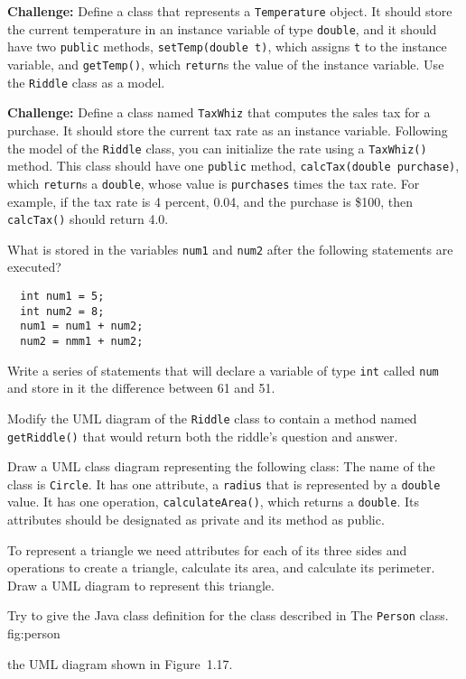 \begin{EXRtwo}
\item  {\bf Challenge:} Define a class that represents a {\tt Temperature}
object.   It should store the current temperature in an instance
variable of type {\tt double}, and it should have two {\tt public}
methods, {\tt setTemp(double t)}, which assigns {\tt t} to the
instance variable, and {\tt getTemp()}, which {\tt return}s the value
of the instance variable.   Use the {\tt Riddle} class as a model.

\item  {\bf Challenge:} Define a class named {\tt TaxWhiz} that computes the
sales tax for a purchase.  It should store the current tax rate as an
instance variable.   Following the model of the {\tt Riddle} class,
you can initialize the rate using a {\tt TaxWhiz()} method.   This
class should have one {\tt public} method, {\tt calcTax(double
purchase)}, which {\tt return}s a {\tt double}, whose value is
{\tt purchases} times the tax rate.  For example, if the tax rate is 4
percent, 0.04, and the purchase is \$100, then
{\tt calcTax()} should return 4.0.

\item What is stored in the variables {\tt num1} and {\tt num2} after the
following statements are executed?
\small
\begin{verbatim}
  int num1 = 5;
  int num2 = 8;
  num1 = num1 + num2;
  num2 = nmm1 + num2;
\end{verbatim}
\normalsize

\item Write a series of statements that will declare a variable of type {\tt int}
called {\tt num} and store in it the difference between 61 and 51.


\item Modify the UML diagram of the {\tt Riddle}
class to contain a method named {\tt getRiddle()} that would return
both the riddle's question and answer.

\item Draw a UML class diagram representing the following
class: The name of the class is {\tt Circle}. It has one
attribute, a {\tt radius} that is represented by a {\tt double}
value. It has one operation, {\tt calculateArea()}, which
returns a {\tt double}. Its attributes should be designated
as private and its method as public.

\item To represent a triangle we need attributes for each of its three
sides and operations to create a triangle, calculate its area, and calculate
its perimeter. Draw a UML diagram to represent this triangle.

\item Try to give the Java class definition for the class described in
%
{The {\tt Person} class.}
{fig:person}

the UML diagram shown in Figure~1.17.

\end{EXRtwo}

